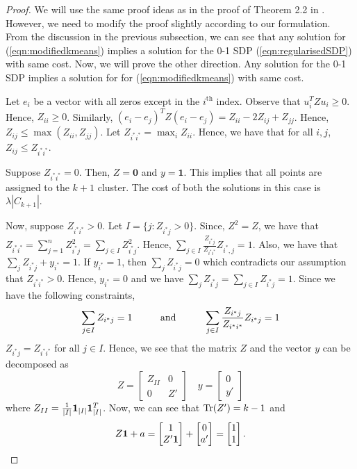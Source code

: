 \begin{proof}
We will use the same proof ideas as in the proof of Theorem 2.2 in \cite{peng2007approximating}. However, we need to modify the proof slightly according to our formulation. From the discussion in the previous subsection, we can see that any solution for (\ref{eqn:modifiedkmeans}) implies a solution for the 0-1 SDP (\ref{eqn:regularisedSDP}) with same cost. Now, we will prove the other direction. Any solution for the 0-1 SDP implies a solution for for (\ref{eqn:modifiedkmeans}) with same cost.

Let $e_i$ be a vector with all zeros except in the $i^{\text{th}}$ index. Observe that $u_i^T Z u_i \ge 0$. Hence, $Z_{ii} \ge 0$. Similarly, $(e_i-e_j)^T Z (e_i-e_j) = Z_{ii} - 2Z_{ij} + Z_{jj}$. Hence, $Z_{ij} \le \max (Z_{ii}, Z_{jj})$. Let $Z_{i^*i^*} = \max_i Z_{ii}$. Hence, we have that for all $i, j$, $Z_{ij} \le Z_{i^* i^*}$. 

Suppose $Z_{i^*i^*} = 0$. Then, $Z = \textbf{0}$ and $y = \textbf{1}$. This implies that all points are assigned to the $k+1$ cluster. The cost of both the solutions in this case is $\lambda |C_{k+1}|$.

Now, suppose $Z_{i^*i^*}>0$. Let $I =\{j: Z_{i^* j} > 0\}$. Since, $Z^2 = Z$, we have that $Z_{i^*i^*} = \sum_{j=1}^n Z^2_{i^* j} = \sum_{j \in I} Z^2_{i^*j}$. Hence, $\sum_{j \in I}\frac{Z_{i^*j}}{Z_{i^*i^*}}Z_{i^*, j} = 1$. Also, we have that $\sum_{j} Z_{i^*j} + y_{i^*} = 1$. If $y_{i^*} = 1$, then $\sum_{j} Z_{i^*j} = 0$ which contradicts our assumption that $Z_{i^*i^*} > 0$. Hence, $y_{i^*} = 0$ and we have $\sum_{j} Z_{i^*j} = \sum_{j\in I} Z_{i^*j} = 1$. Since we have the following constraints,
\begin{align*}
	\sum_{j\in I} Z_{i^*j} = 1 \hspace{0.4in}\text{and} \hspace{0.4in}\sum_{j\in I} \frac{Z_{i^*j}}{Z_{i^*i^*}}Z_{i^*j} = 1
\end{align*}
$Z_{i^*j} = Z_{i^*i^*}$ for all $j \in I$. Hence, we see that the matrix $Z$ and the vector $y$ can be decomposed as 
\[ Z = 
\begin{bmatrix}
    Z_{II}  & 0 \\
    0       & Z'
\end{bmatrix}
\quad y=\begin{bmatrix}
    0 \\
    y' 
\end{bmatrix}
\]
where $Z_{II} = \frac{1}{|I|}\mathbf1_{|I|}\mathbf1_{|I|}^T$. Now, we can see that $\text{Tr}(Z') = k-1$ and
$$Z\mathbf 1 + a = \begin{bmatrix}1\\Z'\mathbf 1\end{bmatrix} + \begin{bmatrix}0\\a'\end{bmatrix} = \begin{bmatrix}1\\1\end{bmatrix}.$$


\end{proof}
